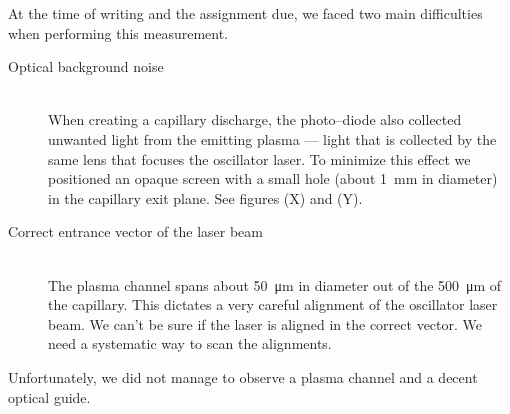 \documentclass[../main.tex]{subfiles}
\begin{document}
At the time of writing and the assignment due, we faced two main difficulties when performing this measurement.
\begin{description}
  \item[\textnormal{Optical background noise}] \hfill \\ When creating a capillary discharge, the photo--diode also collected unwanted light from the emitting plasma --- light that is collected by the same lens that focuses the oscillator laser. To minimize this effect we positioned an opaque screen with a small hole (about \SI{1}{\mm} in diameter) in the capillary exit plane. See figures (X) and (Y).
  \item[\textnormal{Correct entrance vector of the laser beam}] \hfill \\ The plasma channel spans about \SI{50}{\um} in diameter out of the \SI{500}{\um} of the capillary. This dictates a very careful alignment of the oscillator laser beam. We can't be sure if the laser is aligned in the correct vector. We need a systematic way to scan the alignments.
\end{description}

Unfortunately, we did not manage to observe a plasma channel and a decent optical guide.
\end{document}
